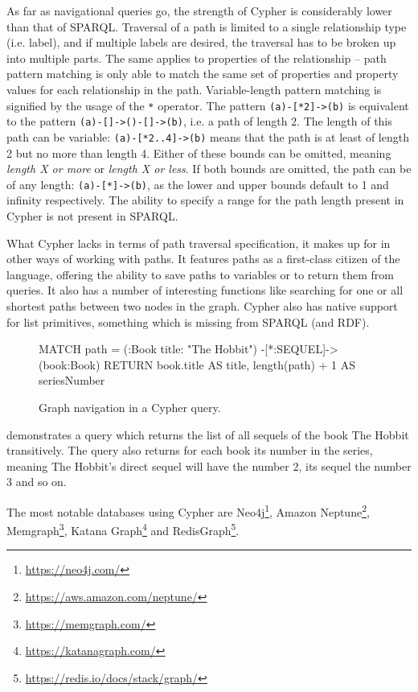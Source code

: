 As far as navigational queries go, the strength of Cypher is considerably lower than that of SPARQL.
Traversal of a path is limited to a single relationship type (i.e. label), and if multiple labels are desired, the traversal has to be broken up into multiple parts.
The same applies to properties of the relationship -- path pattern matching is only able to match the same set of properties and property values for each relationship in the path.
Variable-length pattern matching is signified by the usage of the \texttt{*} operator.
The pattern \texttt{(a)-[*2]->(b)} is equivalent to the pattern \texttt{(a)-[]->()-[]->(b)},
i.e. a path of length 2.
The length of this path can be variable: \texttt{(a)-[*2..4]->(b)} means that the path is at least of length 2 but no more than length 4.
Either of these bounds can be omitted, meaning \textit{length X or more} or \textit{length X or less}.
If both bounds are omitted, the path can be of any length: \texttt{(a)-[*]->(b)}, as the lower and upper bounds default to 1 and infinity respectively.
The ability to specify a range for the path length present in Cypher is not present in SPARQL.

What Cypher lacks in terms of path traversal specification, it makes up for in other ways of working with paths.
It features paths as a first-class citizen of the language, offering the ability to save paths to variables or to return them from queries.
It also has a number of interesting functions like searching for one or all shortest paths between two nodes in the graph.
Cypher also has native support for list primitives, something which is missing from SPARQL (and RDF).

\begin{figure}[ht]
\begin{code}[]
MATCH path = (:Book {title: "The Hobbit"}) -[*:SEQUEL]-> (book:Book)
RETURN book.title AS title, length(path) + 1 AS seriesNumber
\end{code}
\caption{Graph navigation in a Cypher query.}
\label{fig:cyphernav}
\end{figure}

 demonstrates a query which returns the list of all sequels of the book The Hobbit transitively.
The query also returns for each book its number in the series, meaning The Hobbit's direct sequel will have the number 2, its sequel the number 3 and so on.

The most notable databases using Cypher are Neo4j\footnote{\url{https://neo4j.com/}}, Amazon Neptune\footnote{\url{https://aws.amazon.com/neptune/}}, Memgraph\footnote{\url{https://memgraph.com/}}, Katana Graph\footnote{\url{https://katanagraph.com/}} and RedisGraph\footnote{\url{https://redis.io/docs/stack/graph/}}.

